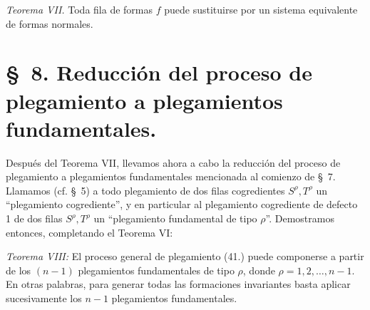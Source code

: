 \documentclass[11pt]{article}
\begin{document}
\emph{Teorema VII.} Toda fila de formas $f$ puede sustituirse por un sistema equivalente de formas normales.

\section*{\S\ 8. Reducción del proceso de plegamiento a plegamientos fundamentales.}
Después del Teorema VII, llevamos ahora a cabo la reducción del proceso de plegamiento a plegamientos fundamentales mencionada al comienzo de \S\ 7. Llamamos (cf. \S\ 5) a todo plegamiento de dos filas cogredientes $S^\rho,T^\rho$ un ``plegamiento cogrediente'', y en particular al plegamiento cogrediente de defecto 1 de dos filas $S^\rho,T^\rho$ un ``plegamiento fundamental de tipo $\rho$''. Demostramos entonces, completando el Teorema VI:

\emph{Teorema VIII:} El proceso general de plegamiento (41.) puede componerse a partir de los $(n-1)$ plegamientos fundamentales de tipo $\rho$, donde $\rho=1,2,\ldots,n-1$. En otras palabras, para generar todas las formaciones invariantes basta aplicar sucesivamente los $n-1$ plegamientos fundamentales.
\end{document}
